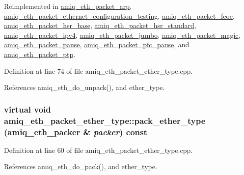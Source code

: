 Reimplemented in \hyperlink{classamiq__eth__packet__arp_afa8463360e8e62b24e1171093b00a798}{amiq\_\-eth\_\-packet\_\-arp}, \hyperlink{classamiq__eth__packet__ethernet__configuration__testing_aff2640ccc3b20b80b16bb6ab20842f76}{amiq\_\-eth\_\-packet\_\-ethernet\_\-configuration\_\-testing}, \hyperlink{classamiq__eth__packet__fcoe_afb550561999badc5693283b852be2f70}{amiq\_\-eth\_\-packet\_\-fcoe}, \hyperlink{classamiq__eth__packet__hsr__base_ae61de71bd90f7a1c605e094845af5ccc}{amiq\_\-eth\_\-packet\_\-hsr\_\-base}, \hyperlink{classamiq__eth__packet__hsr__standard_aac95578ea89db3bd0ec190ca87e731c8}{amiq\_\-eth\_\-packet\_\-hsr\_\-standard}, \hyperlink{classamiq__eth__packet__ipv4_af85e08566b37953edee4566c40400f05}{amiq\_\-eth\_\-packet\_\-ipv4}, \hyperlink{classamiq__eth__packet__jumbo_a2d1f1c25847363d774336f8828384635}{amiq\_\-eth\_\-packet\_\-jumbo}, \hyperlink{classamiq__eth__packet__magic_a400a90ae523af44eb0c38ba64ea6afe7}{amiq\_\-eth\_\-packet\_\-magic}, \hyperlink{classamiq__eth__packet__pause_aa458964a73aa61bca99cb30ffa56f54c}{amiq\_\-eth\_\-packet\_\-pause}, \hyperlink{classamiq__eth__packet__pfc__pause_abc86009030a38ab03469c697ffec73f6}{amiq\_\-eth\_\-packet\_\-pfc\_\-pause}, and \hyperlink{classamiq__eth__packet__ptp_a831addd66dff7e42f2e2e9edb6f976b3}{amiq\_\-eth\_\-packet\_\-ptp}.

Definition at line 74 of file amiq\_\-eth\_\-packet\_\-ether\_\-type.cpp.

References amiq\_\-eth\_\-do\_\-unpack(), and ether\_\-type.\hypertarget{classamiq__eth__packet__ether__type_ac7056e1a4bc251384bcea25055ee62da}{
\subsubsection[{pack\_\-ether\_\-type}]{\setlength{\rightskip}{0pt plus 5cm}virtual void amiq\_\-eth\_\-packet\_\-ether\_\-type::pack\_\-ether\_\-type ({\bf amiq\_\-eth\_\-packer} \& {\em packer}) const}}
\label{classamiq__eth__packet__ether__type_ac7056e1a4bc251384bcea25055ee62da}


Definition at line 60 of file amiq\_\-eth\_\-packet\_\-ether\_\-type.cpp.

References amiq\_\-eth\_\-do\_\-pack(), and ether\_\-type.

